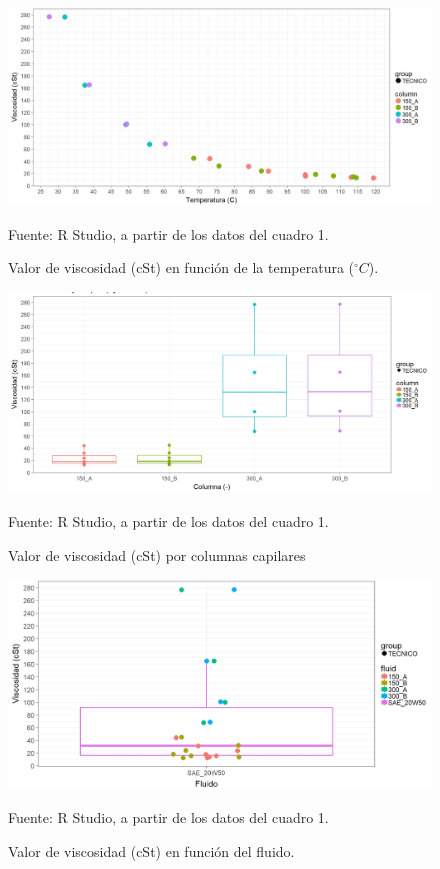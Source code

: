 \documentclass[12pt, letterpaper]{article}
\begin{document}
\begin{landscape}

\begin{figure}[H]
	\centering
	\includegraphics[width=1\columnwidth]{figura_1.png}
	\caption{Valor de viscosidad (cSt) en función de la temperatura ($^{\circ}C$).}
	Fuente: R Studio, a partir de los datos del cuadro 1.
    \label{figura1}
\end{figure}

\begin{figure}[H]
	\centering
	\includegraphics[width=1\columnwidth]{figura_2.png}
	\caption{Valor de viscosidad (cSt) por columnas capilares}
    Fuente: R Studio, a partir de los datos del cuadro 1.
    \label{figura2}
\end{figure}

\begin{figure}[H]
	\centering
	\includegraphics[width=1\columnwidth]{figura_3.png}
	\caption{Valor de viscosidad (cSt) en función del fluido.}
	Fuente: R Studio, a partir de los datos del cuadro 1.
    \label{figura3}
\end{figure}


\end{landscape}
\end{document}
